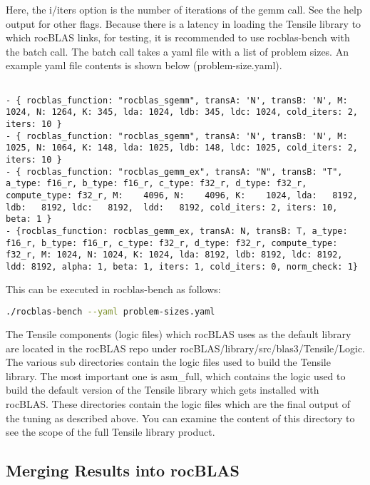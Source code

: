 \documentclass[]{article}
\begin{document}
\noindent
Here, the i/iters option is the number of iterations of the gemm call. See the help output for other flags. Because there is a latency in loading the Tensile library to which rocBLAS links, for testing, it is recommended to use rocblas-bench with the batch call. The batch call takes a yaml file with a list of problem sizes. An example yaml file contents is shown below (problem-size.yaml).

\begin{verbatim}

- { rocblas_function: "rocblas_sgemm", transA: 'N', transB: 'N', M: 1024, N: 1264, K: 345, lda: 1024, ldb: 345, ldc: 1024, cold_iters: 2, iters: 10 }
- { rocblas_function: "rocblas_sgemm", transA: 'N', transB: 'N', M: 1025, N: 1064, K: 148, lda: 1025, ldb: 148, ldc: 1025, cold_iters: 2, iters: 10 }
- { rocblas_function: "rocblas_gemm_ex", transA: "N", transB: "T", a_type: f16_r, b_type: f16_r, c_type: f32_r, d_type: f32_r, compute_type: f32_r, M:    4096, N:    4096, K:    1024, lda:   8192, ldb:   8192, ldc:   8192,  ldd:   8192, cold_iters: 2, iters: 10, beta: 1 }
- {rocblas_function: rocblas_gemm_ex, transA: N, transB: T, a_type: f16_r, b_type: f16_r, c_type: f32_r, d_type: f32_r, compute_type: f32_r, M: 1024, N: 1024, K: 1024, lda: 8192, ldb: 8192, ldc: 8192, ldd: 8192, alpha: 1, beta: 1, iters: 1, cold_iters: 0, norm_check: 1}

\end{verbatim}

\noindent
This can be executed in rocblas-bench as follows:

\begin{lstlisting}[language=bash]
./rocblas-bench --yaml problem-sizes.yaml
\end{lstlisting}

The Tensile components (logic files) which rocBLAS uses as the default library are located in the rocBLAS repo under rocBLAS/library/src/blas3/Tensile/Logic. The various sub directories contain the logic files used to build the Tensile library. The most important one is asm\_full, which contains the logic used to build the default version of the Tensile library which gets installed with rocBLAS. These directories contain the logic files which are the final output of the tuning as described above. You can examine the content of this directory to see the scope of the full Tensile library product.

\subsection{Merging Results into rocBLAS}
\label{sec:merging}
\end{document}
